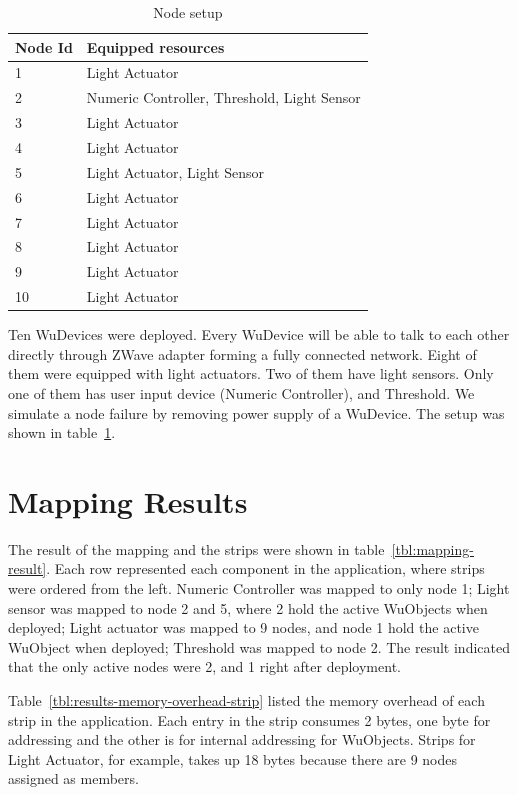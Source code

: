 \begin{table}
\centering
\caption{Node setup}
\label{tbl:setup}
  \begin{tabular}{|l|l|}
  \hline
  \textbf{Node Id} & \textbf{Equipped resources} \\
  \hline
  1 & Light Actuator \\
  \hline
  2 & Numeric Controller, Threshold, Light Sensor \\
  \hline
  3 & Light Actuator \\
  \hline
  4 & Light Actuator \\
  \hline
  5 & Light Actuator, Light Sensor \\
  \hline
  6 & Light Actuator \\
  \hline
  7 & Light Actuator \\
  \hline
  8 & Light Actuator \\
  \hline
  9 & Light Actuator \\
  \hline
  10 & Light Actuator \\
  \hline
  \end{tabular}
\end{table}

Ten WuDevices were deployed. Every WuDevice will be able to talk to each other
directly through ZWave adapter forming a fully connected network. Eight of them
were equipped with light actuators. Two of them have light sensors. Only one of
them has user input device (Numeric Controller), and Threshold. We simulate
a node failure by removing power supply of a WuDevice. The setup was shown in
table~\ref{tbl:setup}.

\section{Mapping Results}

The result of the mapping and the strips were shown in
table~\ref{tbl:mapping-result}. Each row represented each component in the
application, where strips were ordered from the left. Numeric Controller was
mapped to only node 1; Light sensor was mapped to node 2 and 5, where 2 hold the
active WuObjects when deployed; Light actuator was mapped to 9 nodes, and node
1 hold the active WuObject when deployed; Threshold was mapped to node 2.  The
result indicated that the only active nodes were 2, and 1 right after deployment.

Table~\ref{tbl:results-memory-overhead-strip} listed the memory overhead of each
strip in the application. Each entry in the strip consumes 2 bytes, one byte for
addressing and the other is for internal addressing for WuObjects. Strips for Light Actuator, for example, takes up 18 bytes because there are 9 nodes assigned as members.

